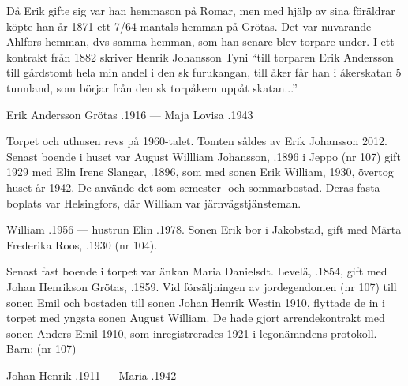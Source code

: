 Då Erik gifte sig var han hemmason på Romar, men med hjälp av sina föräldrar köpte han år 1871 ett 7/64 mantals hemman på Grötas. Det var nuvarande Ahlfors hemman, dvs samma hemman, som han senare blev torpare under. I ett kontrakt från 1882 skriver Henrik Johansson Tyni ``till torparen Erik Andersson till gårdstomt hela min andel i den sk furukangan, till åker får han i åkerskatan 5 tunnland, som börjar från den sk torpåkern uppåt skatan...''

Erik Andersson Grötas .1916  ---  Maja Lovisa .1943



%



%
Torpet och uthusen revs på 1960-talet. Tomten såldes av Erik Johansson 2012. Senast boende i huset var August Willliam Johansson, .1896 i Jeppo (nr 107) gift 1929 med Elin Irene Slangar, .1896, som med sonen Erik William,  1930, övertog huset år 1942. De använde det som semester- och sommarbostad. Deras fasta boplats var Helsingfors, där William var järnvägstjänsteman.

William .1956  ---  hustrun Elin .1978.
Sonen Erik bor i Jakobstad, gift med Märta Frederika Roos, .1930 (nr 104).


%
Senast fast boende i torpet var änkan Maria Danielsdt. Levelä, .1854, gift med Johan Henrikson Grötas, .1859. Vid försäljningen av jordegendomen (nr 107) till sonen Emil och bostaden till sonen Johan Henrik Westin 1910, flyttade de in i torpet med yngsta sonen August William. De hade gjort arrendekontrakt med sonen Anders Emil 1910, som inregistrerades 1921 i legonämndens protokoll.  Barn: (nr 107)

Johan Henrik .1911  ---  Maria .1942


